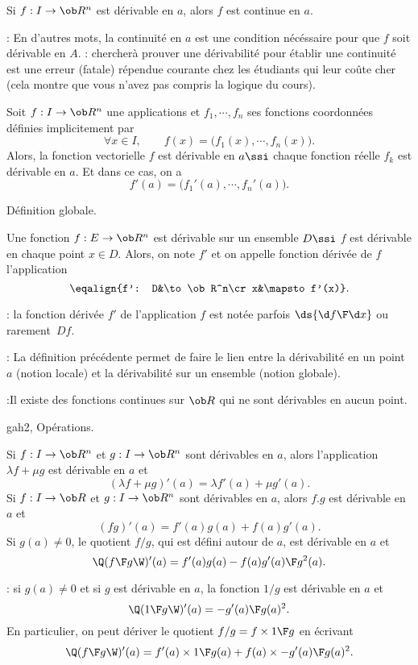 \Propriete [$a\in I$ intervalle] 
Si $f:I\to\ob R^n$ est dérivable en $a$, alors $f$ est continue en $a$. 

\Remarque : En d'autres mots, la continuité en $a$ est une condition nécéssaire pour que $f$ soit dérivable en $A$. 
\bigskip
\Remarque : chercherà prouver une dérivabilité pour établir une continuité est une erreur (fatale) répendue courante chez les étudiants qui leur coûte cher (cela montre que vous n'avez pas compris la logique du cours). 
\bigskip

Soit $f:I\to\ob R^n$ une applications et $f_1, \cdots, f_n$ ses fonctions coordonnées définies implicitement par  
$$
\forall x\in I,\qquad f(x)=\Big(f_1(x),\cdots, f_n(x)\Big).
$$
Alors, la fonction vectorielle $f$ est dérivable en $a\ssi$ chaque fonction réelle $f_k$ est dé\-ri\-va\-ble en $a$. 
Et dans ce cas, on a 
$$
f'(a)=\Big(f_1'(a),\cdots, f_n'(a)\Big).
$$

\Concept Définition globale. 

Une fonction $f:E\to\ob R^n$ est dérivable sur un ensemble $D\ssi$ $f$ est dérivable en chaque point $x\in D$. 
Alors, on note $f'$ et on appelle fonction dérivée de $f$ l'application 
$$
\eqalign{f': D&\to\ob R^n\cr x&\mapsto f'(x)}.
$$ 

: la fonction dérivée $f'$ de l'application $f$ est notée parfois $\ds {\d f\F \d x}$ ou rarement~$Df$. 
\bigskip

: La définition précédente permet de faire le lien entre la dérivabilité en un point $a$ (notion locale) et la dérivabilité sur un ensemble (notion globale). 
\bigskip

:Il existe des fonctions continues sur $\ob R$ qui ne sont dérivables en aucun point. 

\Subsection gah2, Opérations. 

Si $f:I\to\ob R^n$ et $g:I\to\ob R^n$ sont dérivables en $a$, alors l'application $\lambda f+\mu g$ est dérivable en $a$ et 
$$
(\lambda f+\mu g)'(a)=\lambda f'(a)+\mu g'(a). 
$$
Si $f:I\to\ob R$ et $g:I\to\ob R^n$ sont dérivables en $a$, alors $f.g$ est dérivable en $a$ et
$$
(fg)'(a)=f'(a)g(a)+f(a)g'(a).
$$
Si $g(a)\neq 0$, le quotient $f/g$, qui est défini autour de $a$, est dérivable en $a$ et 
$$
\Q({f\F g}\W)'(a)={f'(a)g(a)-f(a)g'(a)\F g^2(a)}.
$$

\Remarque : si $g(a)\neq0$ et si $g$ est dérivable en $a$, la fonction $1/g$ est dérivable en $a$ et 
$$
\Q({1\F g}\W)'(a)=-{g'(a)\F g(a)^2}.
$$
En particulier, on peut dériver le quotient $f/g=f\times{1\F g}$ en écrivant 
$$
\Q({f\F g}\W)'(a)=f'(a)\times {1\F g(a)}+f(a)\times{-g'(a)\F g(a)^2}.
$$

